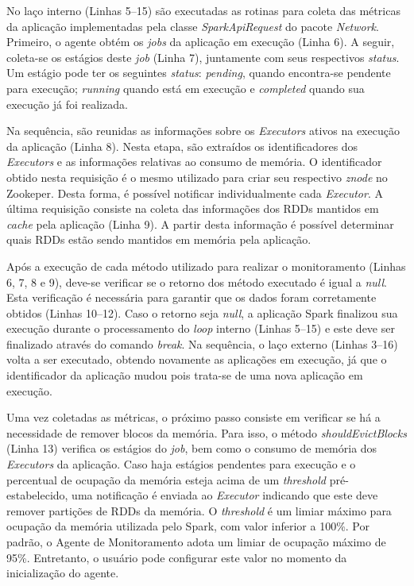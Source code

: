 No laço interno (Linhas 5--15) são executadas as rotinas para coleta das métricas da aplicação implementadas pela classe \textit{SparkApiRequest} do pacote \textit{Network}. Primeiro, o agente obtém os \textit{jobs} da aplicação em execução (Linha 6). A seguir, coleta-se os estágios deste \textit{job} (Linha 7), juntamente com seus respectivos \textit{status}. Um estágio pode ter os seguintes \textit{status}: \textit{pending}, quando encontra-se pendente para execução; \textit{running} quando está em execução e \textit{completed} quando sua execução já foi realizada.

Na sequência, são reunidas as informações sobre os \textit{Executors} ativos na execução da aplicação (Linha 8). Nesta etapa, são extraídos os identificadores dos \textit{Executors} e as informações relativas ao consumo de memória. O identificador obtido nesta requisição é o mesmo utilizado para criar seu respectivo \textit{znode} no Zookeper. Desta forma, é possível notificar individualmente cada \textit{Executor}. A última requisição consiste na coleta das informações dos RDDs mantidos em \textit{cache} pela aplicação (Linha 9). A partir desta informação é possível determinar quais RDDs estão sendo mantidos em memória pela aplicação.

Após a execução de cada método utilizado para realizar o monitoramento (Linhas 6, 7, 8 e 9), deve-se verificar se o retorno dos método executado é igual a \textit{null}. Esta verificação é necessária para garantir que os dados foram corretamente obtidos (Linhas 10--12). Caso o retorno seja \textit{null}, a aplicação Spark finalizou sua execução durante o processamento do \textit{loop} interno (Linhas 5--15) e este deve ser finalizado através do comando \textit{break}. Na sequência, o laço externo (Linhas 3--16) volta a ser executado, obtendo novamente as aplicações em execução, já que o identificador da aplicação mudou pois trata-se de uma nova aplicação em execução.

Uma vez coletadas as métricas, o próximo passo consiste em verificar se há a necessidade de remover blocos da memória. Para isso, o método \textit{shouldEvictBlocks} (Linha 13) verifica os estágios do \textit{job}, bem como o consumo de memória dos \textit{Executors} da aplicação. Caso haja estágios pendentes para execução e o percentual de ocupação da memória esteja acima de um \textit{threshold} pré-estabelecido, uma notificação é enviada ao \textit{Executor} indicando que este deve remover partições de RDDs da memória. 
O \textit{threshold} é um limiar máximo para ocupação da memória utilizada pelo Spark, com valor inferior a 100\%. Por padrão, o Agente de Monitoramento adota um limiar de ocupação máximo de 95\%. Entretanto, o usuário pode configurar este valor no momento da inicialização do agente. 

